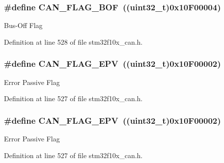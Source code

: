 \subsubsection[{\texorpdfstring{C\+A\+N\+\_\+\+F\+L\+A\+G\+\_\+\+B\+OF}{CAN_FLAG_BOF}}]{\setlength{\rightskip}{0pt plus 5cm}\#define C\+A\+N\+\_\+\+F\+L\+A\+G\+\_\+\+B\+OF~(({\bf uint32\+\_\+t})0x10\+F00004)}\hypertarget{group___c_a_n__flags_ga65f20612d0bf1692003882c0cdbadb1c}{}\label{group___c_a_n__flags_ga65f20612d0bf1692003882c0cdbadb1c}
Bus-\/\+Off Flag 

Definition at line 528 of file stm32f10x\+\_\+can.\+h.

\subsubsection[{\texorpdfstring{C\+A\+N\+\_\+\+F\+L\+A\+G\+\_\+\+E\+PV}{CAN_FLAG_EPV}}]{\setlength{\rightskip}{0pt plus 5cm}\#define C\+A\+N\+\_\+\+F\+L\+A\+G\+\_\+\+E\+PV~(({\bf uint32\+\_\+t})0x10\+F00002)}\hypertarget{group___c_a_n__flags_ga61954e54995f638ed78281ad2b0cf43a}{}\label{group___c_a_n__flags_ga61954e54995f638ed78281ad2b0cf43a}
Error Passive Flag 

Definition at line 527 of file stm32f10x\+\_\+can.\+h.

\subsubsection[{\texorpdfstring{C\+A\+N\+\_\+\+F\+L\+A\+G\+\_\+\+E\+PV}{CAN_FLAG_EPV}}]{\setlength{\rightskip}{0pt plus 5cm}\#define C\+A\+N\+\_\+\+F\+L\+A\+G\+\_\+\+E\+PV~(({\bf uint32\+\_\+t})0x10\+F00002)}\hypertarget{group___c_a_n__flags_ga61954e54995f638ed78281ad2b0cf43a}{}\label{group___c_a_n__flags_ga61954e54995f638ed78281ad2b0cf43a}
Error Passive Flag 

Definition at line 527 of file stm32f10x\+\_\+can.\+h.

